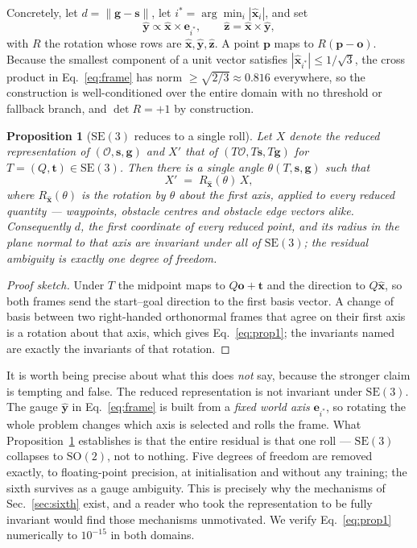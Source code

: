 \documentclass[10pt,twocolumn,letterpaper]{article}
\theoremstyle{plain}
\newtheorem{proposition}{Proposition}
\newcommand{\xhat}{\hat{\mathbf{x}}}
\newcommand{\yhat}{\hat{\mathbf{y}}}
\newcommand{\zhat}{\hat{\mathbf{z}}}
\newcommand{\svec}{\mathbf{s}}
\newcommand{\gvec}{\mathbf{g}}
\newcommand{\SE}{\mathrm{SE}(3)}
\begin{document}
Concretely, let $d=\|\gvec-\svec\|$, let $i^\ast=\arg\min_i|\xhat_i|$, and set
\begin{equation}
  \yhat \propto \xhat\times\mathbf{e}_{i^\ast},
  \qquad
  \zhat = \xhat\times\yhat ,
  \label{eq:frame}
\end{equation}
with $R$ the rotation whose rows are $\xhat,\yhat,\zhat$. A point $\mathbf{p}$ maps
to $R(\mathbf{p}-\mathbf{o})$. Because the smallest component of a unit vector
satisfies $|\xhat_{i^\ast}|\le 1/\sqrt3$, the cross product in
Eq.~\eqref{eq:frame} has norm $\ge\sqrt{2/3}\approx0.816$ everywhere, so the
construction is well-conditioned over the entire domain with no threshold or
fallback branch, and $\det R=+1$ by construction.

\begin{proposition}[$\SE$ reduces to a single roll]
\label{prop:exact}
Let $X$ denote the reduced representation of $(\mathcal{O},\svec,\gvec)$ and $X'$
that of $(T\mathcal{O},T\svec,T\gvec)$ for $T=(Q,\mathbf{t})\in\SE$. Then there is
a single angle $\theta(T,\svec,\gvec)$ such that
\begin{equation}
  X' \;=\; R_{\xhat}(\theta)\, X ,
  \label{eq:prop1}
\end{equation}
where $R_{\xhat}(\theta)$ is the rotation by $\theta$ about the first axis,
applied to every reduced quantity --- waypoints, obstacle centres and obstacle
edge vectors alike. Consequently $d$, the first coordinate of every reduced
point, and its radius in the plane normal to that axis are invariant under all of
$\SE$; the residual ambiguity is exactly one degree of freedom.
\end{proposition}

\begin{proof}[Proof sketch]
Under $T$ the midpoint maps to $Q\mathbf{o}+\mathbf{t}$ and the direction to
$Q\xhat$, so both frames send the start--goal direction to the first basis
vector. A change of basis between two right-handed orthonormal frames that agree
on their first axis is a rotation about that axis, which gives
Eq.~\eqref{eq:prop1}; the invariants named are exactly the invariants of that
rotation.
\end{proof}

It is worth being precise about what this does \emph{not} say, because the
stronger claim is tempting and false. The reduced representation is not invariant
under $\SE$. The gauge $\yhat$ in Eq.~\eqref{eq:frame} is built from a
\emph{fixed world axis} $\mathbf{e}_{i^\ast}$, so rotating the whole problem
changes which axis is selected and rolls the frame. What Proposition~\ref{prop:exact}
establishes is that the entire residual is that one roll --- $\SE$ collapses to
$\mathrm{SO}(2)$, not to nothing. Five degrees of freedom are removed exactly, to
floating-point precision, at initialisation and without any training; the sixth
survives as a gauge ambiguity. This is precisely why the mechanisms of
Sec.~\ref{sec:sixth} exist, and a reader who took the representation to be fully
invariant would find those mechanisms unmotivated. We verify
Eq.~\eqref{eq:prop1} numerically to $10^{-15}$ in both domains.
\end{document}
